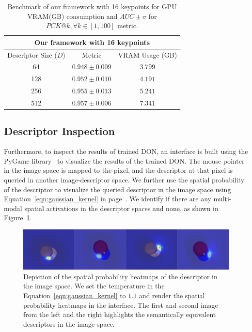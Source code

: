 \begin{table}[htb]
    \caption{Benchmark of our framework with 16 keypoints for GPU VRAM(GB) consumption and $AUC \pm \sigma$ for $PCK@k,  \forall k \in [1, 100]$ metric.}
    \label{table:reduced_framework_training_results}
    \centering
    \begin{tabular}{ccc}
        \toprule
        \multicolumn{3}{c}{Our framework with 16 keypoints}         \\
        \midrule
        Descriptor Size ($D$) & Metric            & VRAM Usage (GB) \\ \hline
        64                    & $0.948 \pm 0.009$ & $3.799 $        \\
        128                   & $0.952 \pm 0.010$ & $4.191 $        \\
        256                   & $0.955 \pm 0.013$ & $5.241 $        \\
        512                   & $0.957 \pm 0.006$ & $7.341 $        \\
        \bottomrule
    \end{tabular}
\end{table}

\subsection{Descriptor Inspection}
Furthermore, to inspect the
results of trained DON, an interface is built using the PyGame library~\cite{pygame} to visualize the results of the trained DON.
The mouse pointer in the image space is mapped to the pixel, and the descriptor at that pixel is queried in another image-descriptor space.
We further use the spatial probability of the descriptor to visualize the queried descriptor
in the image space using Equation~\ref{eqn:gaussian_kernel} in page~\pageref{eqn:gaussian_kernel}.
We identify if there are any multi-modal spatial activations in the descriptor spaces and none, as shown in Figure~\ref{fig:check_don}.

\begin{figure}[htb]
    \centering
    \includegraphics[scale=0.15]{../images/test_don.png}
    \caption{Depiction of the spatial probability heatmaps of the descriptor in the image space. We set the temperature in the Equation~\ref{eqn:gaussian_kernel} to $1.1$
        and render the spatial probability heatmaps in the interface. The first and second image from the left and the right highlights the semantically equivalent descriptors in the image space.}
    \label{fig:check_don}
\end{figure}

